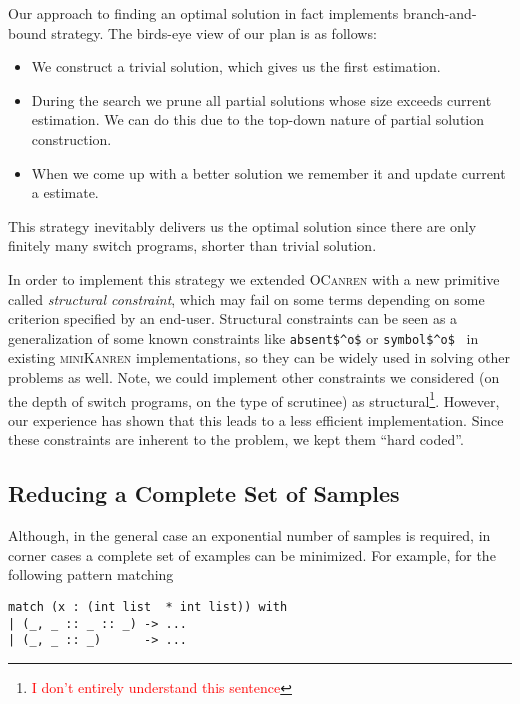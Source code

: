 Our approach to finding an optimal solution in fact implements branch-and-bound strategy. The birds-eye view of our plan is as follows:

\begin{itemize}
\item We construct a trivial solution, which gives us the first estimation.
\item During the search we prune all partial solutions whose size exceeds current estimation. We can do this due to
  the top-down nature of partial solution construction.
\item When we come up with a better solution we remember it and update current a estimate.
\end{itemize}

\noindent This strategy inevitably delivers us the optimal solution since there are only finitely many switch programs, shorter than trivial solution.

In order to implement this strategy we extended \textsc{OCanren} with a new primitive called \emph{structural constraint}, which may
fail on some terms depending on some criterion specified by an end-user. Structural constraints can be seen as a generalization of
some known constraints like \lstinline|absent$^o$| or \lstinline|symbol$^o$|~\cite{Untagged} in existing \textsc{miniKanren} implementations, 
so they can be widely used in solving other problems as well. Note, we could implement other constraints we considered (on the
depth of switch programs, on the type of scrutinee) as structural\footnote{\textcolor{red}{I don't entirely understand this sentence}}. However, our experience has shown that this leads to
a less efficient implementation. Since these constraints are inherent to the problem, we kept them ``hard coded''.


\subsection{Reducing a Complete Set of Samples}
\label{sec:reduced-samples}

Although, in the general case an exponential number of samples is required, in corner cases a complete set of examples can be minimized. For example, for the following pattern matching 

\begin{lstlisting}
match (x : (int list  * int list)) with 
| (_, _ :: _ :: _) -> ...
| (_, _ :: _)      -> ...
\end{lstlisting}

